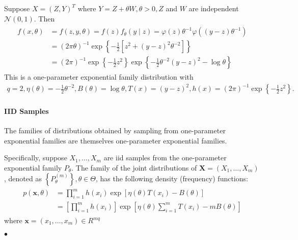 \documentclass{article}
\begin{document}
\begin{exma}
Suppose $X=(Z, Y)^{T}$ where $Y=Z+\theta W, \theta>0, Z$ and $W$ are independent $\mathcal{N}(0,1)$. Then
\begin{align*}
\begin{aligned}
f(x, \theta) &=f(z, y, \theta)=f(z) f_{\theta}(y \mid z)=\varphi(z) \theta^{-1} \varphi\left((y-z) \theta^{-1}\right) \\
&=(2 \pi \theta)^{-1} \exp \left\{-\frac{1}{2}\left[z^{2}+(y-z)^{2} \theta^{-2}\right]\right\} \\
&=(2 \pi)^{-1} \exp \left\{-\frac{1}{2} z^{2}\right\} \exp \left\{-\frac{1}{2} \theta^{-2}(y-z)^{2}-\log \theta\right\}
\end{aligned}
\end{align*}
This is a one-parameter exponential family distribution with
\begin{align*}
q=2, \eta(\theta)=-\frac{1}{2} \theta^{-2}, B(\theta)=\log \theta, T(x)=(y-z)^{2}, h(x)=(2 \pi)^{-1} \exp \left\{-\frac{1}{2} z^{2}\right\} .
\end{align*}
\end{exma}

\paragraph{IID Samples}
The families of distributions obtained by sampling from one-parameter exponential families are themselves one-parameter exponential families.

Specifically, suppose $X_{1}, \ldots, X_{m}$ are \gls{iid} samples from the  one-parameter exponential family $P_{\theta}$. The family of  the joint distributions of $\mathbf{X}=\left(X_{1}, \ldots, X_{m}\right)$, denoted as $\left\{P_{\theta}^{(m)}\right\}, \theta \in \Theta$, has the following density (frequency) functions:
\begin{align*}
\begin{aligned}
p(\mathbf{x}, \theta) &=\prod_{i=1}^{m} h\left(x_{i}\right) \exp \left[\eta(\theta) T\left(x_{i}\right)-B(\theta)\right] \\
&=\left[\prod_{i=1}^{m} h\left(x_{i}\right)\right] \exp \left[\eta(\theta) \sum_{i=1}^{m} T\left(x_{i}\right)-m B(\theta)\right]
\end{aligned}
\end{align*}
where $\mathbf{x}=\left(x_{1}, \ldots, x_{m}\right)\in R^{mq}$

$\bullet$ 
\end{document}
